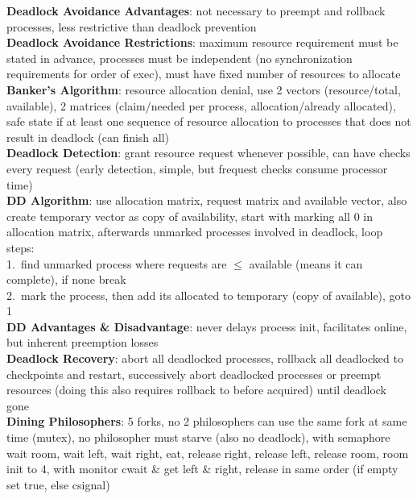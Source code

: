 \documentclass[a4paper]{article}
\begin{document}
\begin{multicols}{2}
        \textbf{Deadlock Avoidance Advantages}: not necessary to preempt and rollback processes, less restrictive than deadlock prevention\\
        \textbf{Deadlock Avoidance Restrictions}: maximum resource requirement must be stated in advance, processes must be independent (no synchronization requirements for order of exec), must have fixed number of resources to allocate\\
        \textbf{Banker's Algorithm}: resource allocation denial, use 2 vectors (resource/total, available), 2 matrices (claim/needed per process, allocation/already allocated), safe state if at least one sequence of resource allocation to processes that does not result in deadlock (can finish all)\\
        \textbf{Deadlock Detection}: grant resource request whenever possible, can have checks every request (early detection, simple, but frequest checks consume processor time)\\
        \textbf{DD Algorithm}: use allocation matrix, request matrix and available vector, also create temporary vector as copy of availability, start with marking all 0 in allocation matrix, afterwards unmarked processes involved in deadlock, loop steps:\\
        1.\ find unmarked process where requests are $\leq$ available (means it can complete), if none break\\
        2.\ mark the process, then add its allocated to temporary (copy of available), goto 1\\
        \textbf{DD Advantages \& Disadvantage}: never delays process init, facilitates online, but inherent preemption losses\\
        \textbf{Deadlock Recovery}: abort all deadlocked processes, rollback all deadlocked to checkpoints and restart, successively abort deadlocked processes or preempt resources (doing this also requires rollback to before acquired) until deadlock gone\\
        \textbf{Dining Philosophers}: 5 forks, no 2 philosophers can use the same fork at same time (mutex), no philosopher must starve (also no deadlock), with semaphore wait room, wait left, wait right, eat, release right, release left, release room, room init to 4, with monitor cwait \& get left \& right, release in same order (if empty set true, else csignal)\\
    \end{multicols}
    
\end{document}

